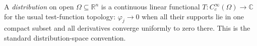 
A \emph{distribution} on open $\Omega\subseteq\mathbb R^n$ is a continuous linear functional $T:C_c^\infty(\Omega)\to\mathbb C$ for the usual test-function topology: $\varphi_j\to0$ when all their supports lie in one compact subset and all derivatives converge uniformly to zero there. This is the standard distribution-space convention.
